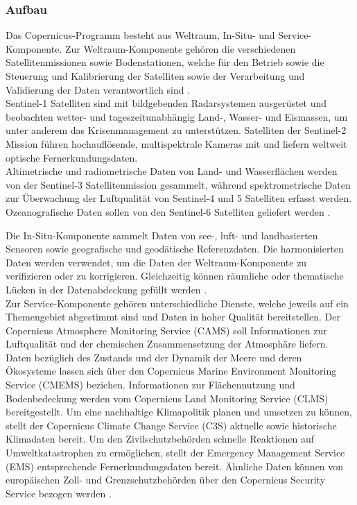 \subsubsection{Aufbau}
Das Copernicus-Programm besteht aus Weltraum, In-Situ- und Service-Komponente. 
Zur Weltraum-Komponente gehören die verschiedenen Satellitenmissionen sowie Bodenstationen, welche für den Betrieb sowie die Steuerung und Kalibrierung der 
Satelliten sowie der Verarbeitung und Validierung der Daten verantwortlich sind \cite{copernicus_regulation}. \\ 
Sentinel-1 Satelliten sind mit bildgebenden Radarsystemen ausgerüstet und beobachten wetter- und tageszeitunabhängig Land-, Wasser- und Eismassen, um unter anderem das 
Krisenmanagement zu unterstützen.
Satelliten der Sentinel-2 Mission führen hochauflösende, multispektrale Kameras mit und liefern weltweit optische Fernerkundungsdaten. \\
Altimetrische und radiometrische Daten von Land- und Wasserflächen werden von der Sentinel-3 Satellitenmission gesammelt, während spektrometrische Daten zur 
Überwachung der Luftqualität von Sentinel-4 und 5 Satelliten erfasst werden.
Ozeanografische Daten sollen von den Sentinel-6 Satelliten geliefert werden \cite{sentinel_overview}.

Die In-Situ-Komponente sammelt Daten von see-, luft- und landbasierten Sensoren sowie geografische und geodätische Referenzdaten. Die harmonisierten Daten 
werden verwendet, um die Daten der Weltraum-Komponente zu verifizieren oder zu korrigieren. Gleichzeitig können räumliche oder thematische Lücken in der 
Datenabdeckung gefüllt werden \cite{copernicus_regulation}\cite{what_is_copernicus}. \\

Zur Service-Komponente gehören unterschiedliche Dienste, welche jeweils auf ein Themengebiet abgestimmt sind und Daten in hoher Qualität bereitstellen.
Der Copernicus Atmosphere Monitoring Service (CAMS) soll Informationen zur Luftqualität und der chemischen Zusammensetzung der Atmosphäre liefern. 
Daten bezüglich des Zustands und der Dynamik der Meere und deren Ökosysteme lassen sich über den Copernicus Marine Environment Monitoring Service (CMEMS) beziehen. 
Informationen zur Flächennutzung und Bodenbedeckung werden vom Copernicus Land Monitoring Service (CLMS) bereitgestellt. 
Um eine nachhaltige Klimapolitik planen und umsetzen zu können, stellt der Copernicus Climate Change Service (C3S) aktuelle sowie historische Klimadaten bereit.  
Um den Zivilschutzbehörden schnelle Reaktionen auf Umweltkatastrophen zu ermöglichen, stellt der Emergency Management Service (EMS) entsprechende Fernerkundungsdaten 
bereit. Ähnliche Daten können von europäischen Zoll- und Grenzschutzbehörden über den Copernicus Security Service bezogen werden
\cite{copernicus_regulation}\cite{what_is_copernicus}.

